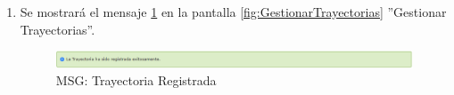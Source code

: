 \begin{enumerate}
			\item Se mostrará el mensaje \ref{fig:trayRegistrada} en la pantalla \ref{fig:GestionarTrayectorias} ''Gestionar Trayectorias''.
			
			\begin{figure}[htbp!]
				\begin{center}
					\includegraphics[scale=0.6]{roles/lider/casosUso/trayectorias/pantallas/IU6-1-1-1MSG1}
					\caption{MSG: Trayectoria Registrada}
					\label{fig:trayRegistrada}
				\end{center}
			\end{figure}
			\end{enumerate}